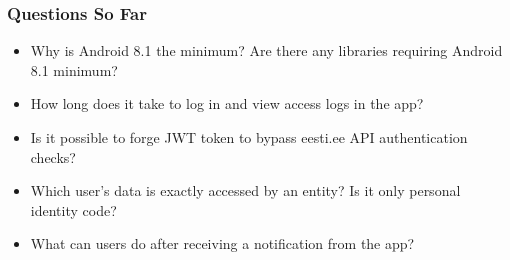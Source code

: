 \documentclass[aspectratio=169,11pt]{beamer}
\begin{document}
\begin{frame}
    \frametitle{Questions So Far}
    \begin{itemize}
        \item Why is Android 8.1 the minimum? Are there any libraries requiring Android 8.1 minimum?
        \item How long does it take to log in and view access logs in the app?
        \item Is it possible to forge JWT token to bypass eesti.ee API authentication checks?
        \item Which user's data is exactly accessed by an entity? Is it only personal identity code?
        \item What can users do after receiving a notification from the app?
    \end{itemize}
\end{frame}
\end{document}
